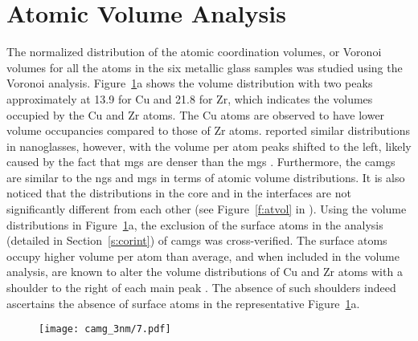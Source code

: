 \section{Atomic Volume Analysis} \label{s:atvolcamg}
\begin{changebar}
The normalized distribution of the atomic coordination volumes, or Voronoi volumes \cite{Cheng2019,Lu2018} for all the atoms in the six metallic glass samples was studied using the Voronoi analysis. Figure~\ref{f:vol_camg}a shows the volume distribution with two peaks approximately at 13.9 \acu for Cu and 21.8 \acu for Zr, which indicates the volumes occupied by the Cu and Zr atoms. The Cu atoms are observed to have lower volume occupancies compared to those of Zr atoms. \textcite{Cheng2019} reported similar distributions in \czsix nanoglasses, however, with the volume per atom peaks shifted to the left, likely caused by the fact that \czsix \gls{mg}s are denser than the \cz \gls{mg}s \cite{Li2008}. Furthermore, the \gls{camg}s are similar to the \gls{ng}s and \gls{mg}s in terms of atomic volume distributions. It is also noticed that the distributions in the core and in the interfaces are not significantly different from each other (see Figure~\ref{f:atvol} in ). Using the volume distributions in Figure~\ref{f:vol_camg}a, the exclusion of the surface atoms in the analysis (detailed in Section~\ref{s:corint}) of \gls{camg}s was cross-verified. The surface atoms occupy higher volume per atom than average, and when included in the volume analysis, are known to alter the volume distributions of Cu and Zr atoms with a shoulder to the right of each main peak \cite{Cheng2019}. The absence of such shoulders indeed ascertains the absence of surface atoms in the representative Figure~\ref{f:vol_camg}a. \par

\begin{figure}[!h] \centering
	\texttt{[image: camg\_3nm/7.pdf]}
	\label{f:vol_camg}
\end{figure}



\end{changebar}
